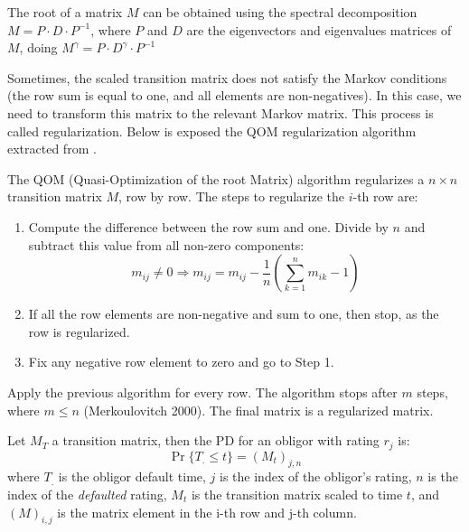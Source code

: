\documentclass[11pt,fleqn]{book} %
\begin{document}
The root of a matrix $M$ can be obtained using the spectral decomposition
$M = P \cdot D \cdot P^{-1}$, where $P$ and $D$ are the eigenvectors and
eigenvalues matrices of $M$, doing $M^{\gamma} = P \cdot D^{\gamma} \cdot P^{-1}$

Sometimes, the scaled transition matrix does not satisfy the Markov conditions
(the row sum is equal to one, and all elements are non-negatives). In this case, 
we need to transform this matrix to the relevant Markov matrix. This process is 
called regularization. Below is exposed the QOM regularization algorithm 
extracted from \cite{kreinin:2001}.

\begin{algorithm}
	The QOM (Quasi-Optimization of the root Matrix) algorithm regularizes a 
	$n {\times} n$ transition matrix $M$, row by row. The steps to 
	regularize the $i$-th row are:
	\begin{enumerate}
		\item Compute the difference between the row sum and one. 
		Divide by $n$ and subtract this value from all non-zero components:
		\begin{displaymath}
			m_{ij} \ne 0 
			\Longrightarrow 
			m_{ij} = m_{ij} - \frac{1}{n} \left( \sum_{k=1}^{n} m_{ik} - 1\right)
		\end{displaymath}
		\item If all the row elements are non-negative and sum to one, 
		then stop, as the row is regularized.
		\item Fix any negative row element to zero and go to Step 1.
	\end{enumerate}
	
	Apply the previous algorithm for every row. The algorithm stops after $m$ 
	steps, where $m \le n$ (Merkoulovitch 2000). The final matrix is a regularized
	matrix. 
\end{algorithm}

\begin{proposition}
	\label{prop:pdftm}
	Let $M_T$ a transition matrix, then the PD for an obligor with 
	rating $r_j$ is:
	\begin{displaymath}
		\Pr\{T_. \le t\} = \left( M_t \right)_{j,n}
	\end{displaymath}
	where $T_.$ is the obligor default time, $j$ is the index of the obligor's
	rating, $n$ is the index of the \emph{defaulted} rating, $M_t$ is the 
	transition matrix scaled to time $t$, and $(M)_{i,j}$ is the matrix element
	in the i-th row and j-th column.
\end{proposition}
\end{document}
